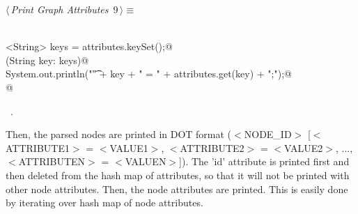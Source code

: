 \documentclass[a4paper]{report}
\begin{document}
\begin{flushleft} \small
\begin{minipage}{\linewidth}\label{scrap9}\raggedright\small
{} $\langle\,${\itshape Print Graph Attributes}\nobreak\ {\footnotesize {9}}$\,\rangle\equiv$
\vspace{-1ex}
\begin{list}{}{} \item
\mbox{}\verb@@\\
\mbox{}\verb@Set<String> keys = attributes.keySet();@\\
\mbox{}\verb@for(String key: keys){@\\
\mbox{}\verb@        System.out.println("\t" + key + " = " + attributes.get(key) + ";");@\\
\mbox{}\verb@}   @\\
\mbox{}\verb@@{\NWsep}
\end{list}
\vspace{-1.5ex}
\footnotesize
\begin{list}{}{\setlength{\itemsep}{-\parsep}\setlength{\itemindent}{-\leftmargin}}
\item \NWtxtMacroRefIn\ .

\item{}
\end{list}
\end{minipage}\vspace{4ex}
\end{flushleft}
Then, the parsed nodes are printed in DOT format ($<$NODE\_ID$>$ [$<$ATTRIBUTE1$>$ = $<$VALUE1$>$, $<$ATTRIBUTE2$>$ = $<$VALUE2$>$, ..., $<$ATTRIBUTEN$>$ = $<$VALUEN$>$]). The 'id' attribute is printed first and then deleted from the hash map of attributes, so that it will not be printed with other node attributes. Then, the node attributes are printed. This is easily done by iterating over hash map of node attributes.
\end{document}
